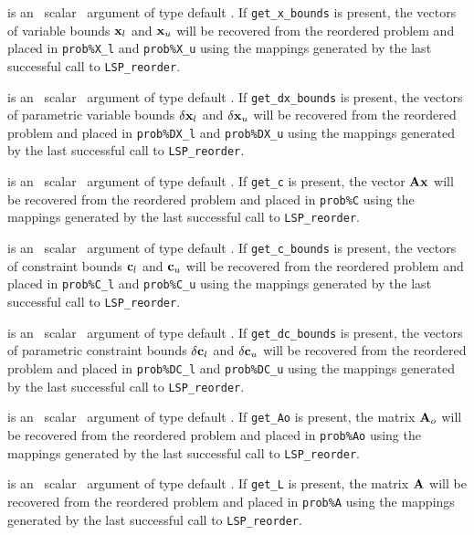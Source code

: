 \documentclass{galahad}
\newcommand{\packagename}{LSP}
\begin{document}
\begin{description}
is an \optional\ scalar \intentin\ argument of type default \logical.
If {\tt get\_x\_bounds} is present,
the vectors of variable bounds ${\mathbf{x}}_l$ and ${\mathbf{x}}_u$
will be recovered from  the reordered problem and placed in {\tt prob\%X\_l}
and {\tt prob\%X\_u} using the mappings generated by the last successful
call to {\tt \packagename\_reorder}.

is an \optional\ scalar \intentin\ argument of type default \logical.
If {\tt get\_dx\_bounds} is present,
the vectors of parametric variable bounds $\delta {\mathbf{x}}_l$ and
$\delta {\mathbf{x}}_u$
will be recovered from  the reordered problem and placed in {\tt prob\%DX\_l}
and {\tt prob\%DX\_u} using the mappings generated by the last successful
call to {\tt \packagename\_reorder}.

is an \optional\ scalar \intentin\ argument of type default \logical.
If {\tt get\_c} is present, the vector ${\mathbf{A}} {\mathbf{x}}$
will be recovered from  the reordered problem and placed in {\tt prob\%C}
using the mappings generated by the last successful call to
{\tt \packagename\_reorder}.

is an \optional\ scalar \intentin\ argument of type default \logical.
If {\tt get\_c\_bounds} is present,
the vectors of constraint bounds ${\mathbf{c}}_l$ and
${\mathbf{c}}_u$
will be recovered from  the reordered problem and placed in {\tt prob\%C\_l}
and {\tt prob\%C\_u} using the mappings generated by the last successful
call to {\tt \packagename\_reorder}.

is an \optional\ scalar \intentin\ argument of type default \logical.
If {\tt get\_dc\_bounds} is present,
the vectors of parametric constraint bounds $\delta {\mathbf{c}}_l$ and $\delta {\mathbf{c}}_u$
will be recovered from  the reordered problem and placed in {\tt prob\%DC\_l}
and {\tt prob\%DC\_u} using the mappings generated by the last successful
call to {\tt \packagename\_reorder}.

is an \optional\ scalar \intentin\ argument of type default \logical.
If {\tt get\_Ao} is present, the matrix ${\mathbf{A}}_o$
will be recovered from the reordered problem and placed in {\tt prob\%Ao}
using the mappings generated by the last successful call to
{\tt \packagename\_reorder}.

is an \optional\ scalar \intentin\ argument of type default \logical.
If {\tt get\_L} is present, the matrix ${\mathbf{A}}$
will be recovered from the reordered problem and placed in {\tt prob\%A}
using the mappings generated by the last successful call to
{\tt \packagename\_reorder}.

\end{description}
\end{document}
